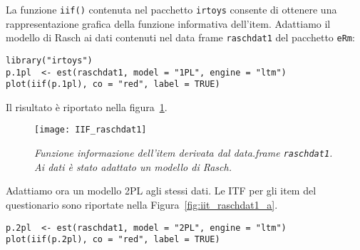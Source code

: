 


\begin{exmp}
La funzione {\tt iif()} contenuta nel pacchetto {\tt irtoys} consente di ottenere una rappresentazione grafica della funzione informativa dell'item. Adattiamo il modello di Rasch ai dati contenuti nel data frame {\tt raschdat1} del pacchetto {\tt eRm}:
\begin{lstlisting}
library("irtoys")
p.1pl  <- est(raschdat1, model = "1PL", engine = "ltm")
plot(iif(p.1pl), co = "red", label = TRUE)
\end{lstlisting}
Il risultato è riportato nella figura~\ref{fig:iit_raschdat1}.
\begin{figure}[h!]
  \centering
    \texttt{[image: IIF\_raschdat1]}
    \caption{{\it Funzione informazione dell'item derivata dal data.frame {\tt raschdat1}. Ai dati è stato adattato un modello di Rasch.}}
    \label{fig:iit_raschdat1}
\end{figure}
Adattiamo ora un modello 2PL agli stessi dati. Le ITF per gli item del questionario sono riportate nella Figura~\ref{fig:iit_raschdat1_a}.
\begin{lstlisting}
p.2pl  <- est(raschdat1, model = "2PL", engine = "ltm")
plot(iif(p.2pl), co = "red", label = TRUE)
\end{lstlisting}


\end{exmp}

